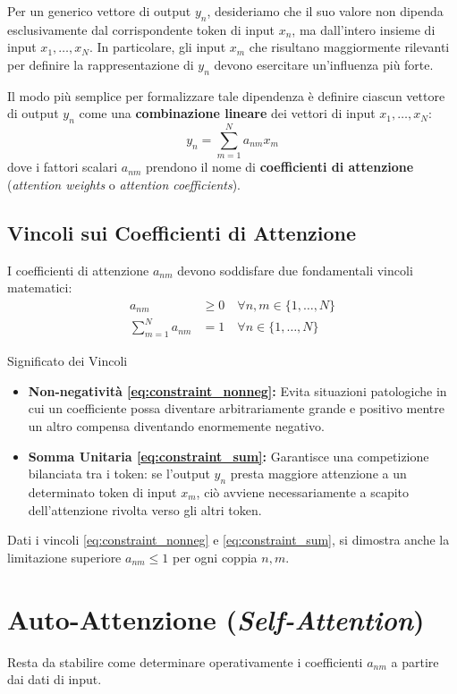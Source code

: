 Per un generico vettore di output $y_n$, desideriamo che il suo valore non dipenda esclusivamente dal corrispondente token di input $x_n$, ma dall'intero insieme di input $x_1, \dots, x_N$. In particolare, gli input $x_m$ che risultano maggiormente rilevanti per definire la rappresentazione di $y_n$ devono esercitare un'influenza più forte.

Il modo più semplice per formalizzare tale dipendenza è definire ciascun vettore di output $y_n$ come una \textbf{combinazione lineare} dei vettori di input $x_1, \dots, x_N$:
\begin{equation}
y_n = \sum_{m=1}^{N} a_{nm} x_m
\end{equation}
dove i fattori scalari $a_{nm}$ prendono il nome di \textbf{coefficienti di attenzione} (\textit{attention weights} o \textit{attention coefficients}).

\subsection{Vincoli sui Coefficienti di Attenzione}
I coefficienti di attenzione $a_{nm}$ devono soddisfare due fondamentali vincoli matematici:
\begin{align}
a_{nm} &\ge 0 \quad \forall n,m \in \{1, \dots, N\} \label{eq:constraint_nonneg} \\
\sum_{m=1}^{N} a_{nm} &= 1 \quad \forall n \in \{1, \dots, N\} \label{eq:constraint_sum}
\end{align}

\begin{observation}{Significato dei Vincoli}
\begin{itemize}
    \item \textbf{Non-negatività \eqref{eq:constraint_nonneg}:} Evita situazioni patologiche in cui un coefficiente possa diventare arbitrariamente grande e positivo mentre un altro compensa diventando enormemente negativo.
    \item \textbf{Somma Unitaria \eqref{eq:constraint_sum}:} Garantisce una competizione bilanciata tra i token: se l'output $y_n$ presta maggiore attenzione a un determinato token di input $x_m$, ciò avviene necessariamente a scapito dell'attenzione rivolta verso gli altri token.
\end{itemize}
Dati i vincoli \eqref{eq:constraint_nonneg} e \eqref{eq:constraint_sum}, si dimostra anche la limitazione superiore $a_{nm} \le 1$ per ogni coppia $n, m$.
\end{observation}

\section{Auto-Attenzione (\textit{Self-Attention})}
Resta da stabilire come determinare operativamente i coefficienti $a_{nm}$ a partire dai dati di input.

